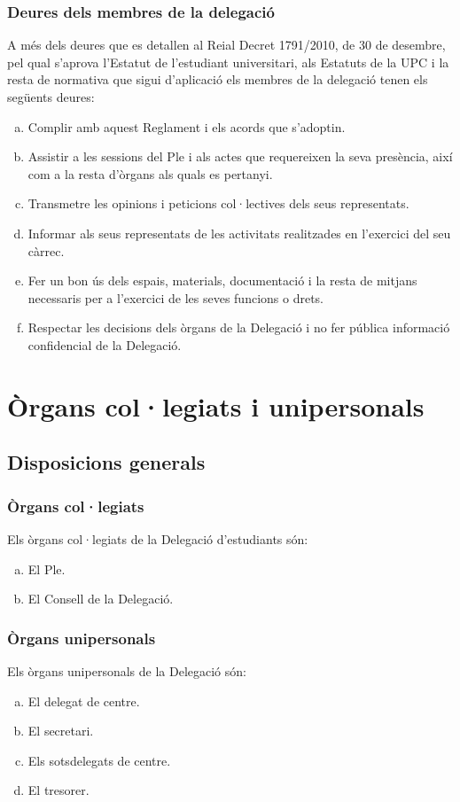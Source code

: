 \documentclass[a4paper,12pt]{article}
\begin{document}
\subsubsection{Deures dels membres de la delegació}
A més dels deures que es detallen al Reial Decret 1791/2010, de 30 de desembre, pel qual s’aprova l’Estatut de l’estudiant universitari, als Estatuts de la UPC i la resta de normativa que sigui d’aplicació els membres de la delegació tenen els següents deures:

\begin{enumerate}[a)]
	\item Complir amb aquest Reglament i els acords que s’adoptin.
	\item Assistir a les sessions del Ple i als actes que requereixen la seva presència, així com a la resta d’òrgans als quals es pertanyi.
	\item Transmetre les opinions i peticions col·lectives dels seus representats.
	\item Informar als seus representats de les activitats realitzades en l’exercici del seu càrrec.
	\item Fer un bon ús dels espais, materials, documentació i la resta de mitjans necessaris per a l’exercici de les seves funcions o drets.
	\item Respectar les decisions dels òrgans de la Delegació i no fer pública informació confidencial de la Delegació.
\end{enumerate}

\section{Òrgans col·legiats i unipersonals}
\subsection{Disposicions generals}
\subsubsection{Òrgans col·legiats}
Els òrgans col·legiats de la Delegació d’estudiants són:
\begin{enumerate}[a)]
	\item El Ple.
	\item El Consell de la Delegació.
\end{enumerate}

\subsubsection{Òrgans unipersonals}
Els òrgans unipersonals de la Delegació són:
\begin{enumerate}[a)]
	\item El delegat de centre.
	\item El secretari.
	\item Els sotsdelegats de centre.
	\item El tresorer.
\end{enumerate}
\end{document}
